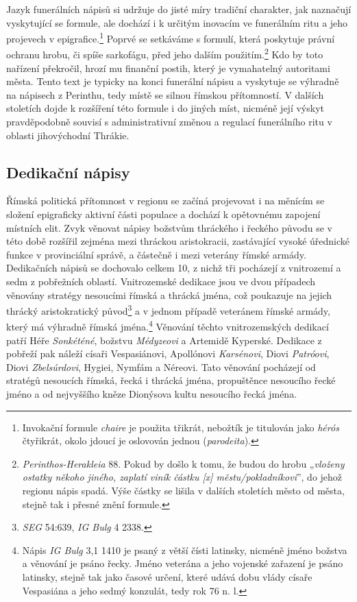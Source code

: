 Jazyk funerálních nápisů si udržuje do jisté míry tradiční charakter, jak naznačují vyskytující se formule, ale dochází i k určitým inovacím ve funerálním ritu a jeho projevech v epigrafice.\footnote{Invokační formule {\em chaire} je použita třikrát, nebožtík je titulován jako {\em hérós} čtyřikrát, okolo jdoucí je oslovován jednou ({\em parodeita}).} Poprvé se setkáváme s formulí, která poskytuje právní ochranu hrobu, či spíše sarkofágu, před jeho dalším použitím.\footnote{{\em Perinthos-Herakleia} 88. Pokud by došlo k tomu, že budou do hrobu „{\em vloženy ostatky někoho jiného, zaplatí viník částku {[}x{]} městu/pokladníkovi}”, do jehož regionu nápis spadá. Výše částky se lišila v dalších stoletích město od města, stejně tak i přesné znění formule.} Kdo by toto nařízení překročil, hrozí mu finanční postih, který je vymahatelný autoritami města. Tento text je typicky na konci funerální nápisu a vyskytuje se výhradně na nápisech z Perinthu, tedy místě se silnou římskou přítomností. V dalších stoletích dojde k rozšíření této formule i do jiných míst, nicméně její výskyt pravděpodobně souvisí s administrativní změnou a regulací funerálního ritu v oblasti jihovýchodní Thrákie.

\subsection[dedikační-nápisy-11]{Dedikační nápisy}

Římská politická přítomnost v regionu se začíná projevovat i na měnícím se složení epigraficky aktivní části populace a dochází k opětovnému zapojení místních elit. Zvyk věnovat nápisy božstvům thráckého i řeckého původu se v této době rozšířil zejména mezi thráckou aristokracii, zastávající vysoké úřednické funkce v provinciální správě, a částečně i mezi veterány římské armády. Dedikačních nápisů se dochovalo celkem 10, z nichž tři pocházejí z vnitrozemí a sedm z pobřežních oblastí. Vnitrozemské dedikace jsou ve dvou případech věnovány stratégy nesoucími římská a thrácká jména, což poukazuje na jejich thrácký aristokratický původ\footnote{{\em SEG} 54:639, {\em IG Bulg} 4 2338.} a v jednom případě veteránem římské armády, který má výhradně římská jména.\footnote{Nápis {\em IG Bulg} 3,1 1410 je psaný z větší čísti latinsky, nicméně jméno božstva a věnování je psáno řecky. Jméno veterána a jeho vojenské zařazení je psáno latinsky, stejně tak jako časové určení, které udává dobu vlády císaře Vespasiána a jeho sedmý konzulát, tedy rok 76 n. l.} Věnování těchto vnitrozemských dedikací patří Héře {\em Sonkéténé}, božstvu {\em Médyzeovi} a Artemidě Kyperské. Dedikace z pobřeží pak náleží císaři Vespasiánovi, Apollónovi {\em Karsénovi}, Diovi {\em Patróovi}, Diovi {\em Zbelsúrdovi}, Hygiei, Nymfám a Néreovi. Tato věnování pocházejí od stratégů nesoucích římská, řecká i thrácká jména, propuštěnce nesoucího řecké jméno a od nejvyššího kněze Dionýsova kultu nesoucího řecká jména.

